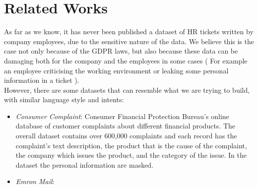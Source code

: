 \chapter{Related Works}
\label{sec:RelatedWorks}

As far as we know, it has never been published a dataset of HR tickets written by company employees, due to the sensitive nature of the data. We believe this is the case not only because of the GDPR laws, but also because these data can be damaging both for the company and the employees in some cases ( For example an employee criticising the working environment or leaking some personal information in a ticket ).  \\
However, there are some datasets that can resemble what we are trying to build, with similar language style and intents:
\begin{itemize}
    \item \textit{Consumer Complaint}: Consumer Financial Protection Bureau's online database of customer complaints about different financial products. The overall dataset contains over 600,000 complaints and each record has the complaint's text description, the product that is the cause of the complaint, the company which issues the product, and the category of the issue. In the dataset the personal information are masked.
    \item \textit{Emron Mail}:
\end{itemize}
